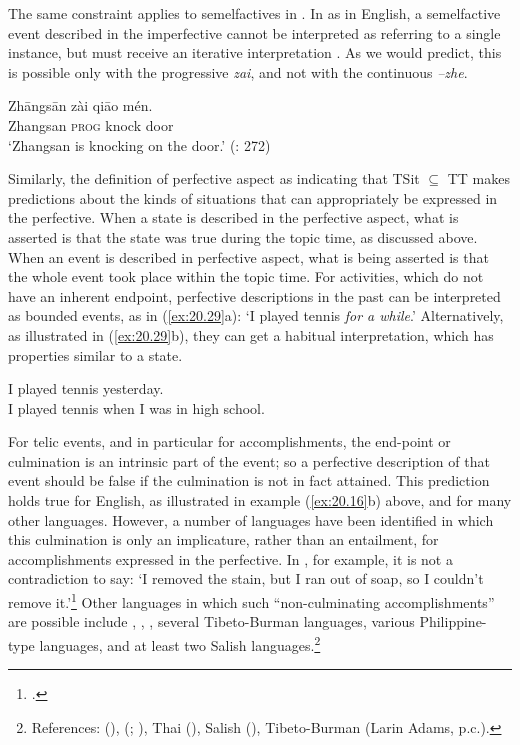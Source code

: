 The same constraint applies to semelfactives in . In  as in English, a semelfactive event described in the imperfective cannot be interpreted as referring to a single instance, but must receive an iterative interpretation . As we would predict, this is possible only with the progressive \textit{zai}, and not with the continuous \textit{–zhe}.


\ea \label{ex:20.28}
\gll Zhāngsān  zài  qiāo  mén.\\
Zhangsan  \textsc{prog}  knock  door\\
\glt ‘Zhangsan is knocking on the door.’  (\citealt{Smith1997}: 272)
\z


Similarly, the definition of perfective aspect as indicating that TSit ${\subseteq}$ TT makes predictions about the kinds of situations that can appropriately be expressed in the perfective. When a state is described in the perfective aspect, what is asserted is that the state was true during the topic time, as discussed above. When an event is described in perfective aspect, what is being asserted is that the whole event took place within the topic time. For activities, which do not have an inherent endpoint, perfective descriptions in the past can be interpreted as bounded events, as in (\ref{ex:20.29}a): ‘I played tennis \textit{for a while}.’ Alternatively, as illustrated in (\ref{ex:20.29}b), they can get a habitual interpretation, which has properties similar to a state.


\ea \label{ex:20.29}
\ea  I played tennis yesterday.\\
\ex I played tennis when I was in high school.
                       \z
\z


For telic events, and in particular for accomplishments, the end-point or culmination is an intrinsic part of the event; so a perfective description of that event should be false if the culmination is not in fact attained. This prediction holds true for English, as illustrated in example (\ref{ex:20.16}b) above, and for many other languages. However, a number of languages have been identified in which this culmination is only an implicature, rather than an entailment, for accomplishments expressed in the perfective. In , for example, it is not a contradiction to say: ‘I removed the stain, but I ran out of soap, so I couldn’t remove it.’\footnote{\citet[186]{Dell1983}.} Other languages in which such “non-culminating accomplishments” are possible include , , , several Tibeto-Burman languages, various Philippine-type languages, and at least two Salish languages.\footnote{References:  (\citealt{Singh1991,Singh1998}),  (\citealt{SohKuo2005}; \citealt{KoenigChief2008}), Thai (\citealt{KoenigMuansuwan2000}), Salish (\citealt{Bar-elEtAl2005}), Tibeto-Burman (Larin Adams, p.c.).}



